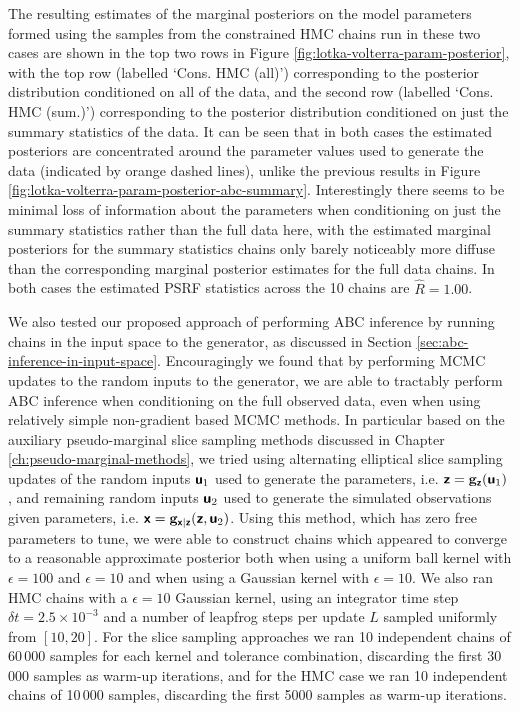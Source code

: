 The resulting estimates of the marginal posteriors on the model parameters formed using the samples from the constrained \ac{HMC} chains run in these two cases are shown in the top two rows in Figure \ref{fig:lotka-volterra-param-posterior}, with the top row (labelled `Cons. HMC (all)') corresponding to the posterior distribution conditioned on all of the data, and the second row (labelled `Cons. HMC (sum.)') corresponding to the posterior distribution conditioned on just the summary statistics of the data. It can be seen that in both cases the estimated posteriors are concentrated around the parameter values used to generate the data (indicated by orange dashed lines), unlike the previous results in Figure \ref{fig:lotka-volterra-param-posterior-abc-summary}. Interestingly there seems to be minimal loss of information about the parameters when conditioning on just the summary statistics rather than the full data here, with the estimated marginal posteriors for the summary statistics chains only barely noticeably more diffuse than the corresponding marginal posterior estimates for the full data chains. In both cases the estimated \ac{PSRF} statistics across the 10 chains are $\hat{R} = 1.00$.

We also tested our proposed approach of performing \ac{ABC} inference by running chains in the input space to the generator, as discussed in Section \ref{sec:abc-inference-in-input-space}. Encouragingly we found that by performing \ac{MCMC} updates to the random inputs to the generator, we are able to tractably perform \ac{ABC} inference when conditioning on the full observed data, even when using relatively simple non-gradient based \ac{MCMC} methods. In particular based on the auxiliary pseudo-marginal slice sampling methods discussed in Chapter \ref{ch:pseudo-marginal-methods}, we tried using alternating elliptical slice sampling updates of the random inputs $\boldsymbol{\mathsf{u}}_1$ used to generate the parameters, i.e. $\boldsymbol{\mathsf{z}} = {\mathbf{g}}_{\boldsymbol{\mathsf{z}}}(\boldsymbol{\mathsf{u}}_1)$, and remaining random inputs $\boldsymbol{\mathsf{u}}_2$ used to generate the simulated observations given parameters, i.e. $\boldsymbol{\mathsf{x}} = {\mathbf{g}}_{\boldsymbol{\mathsf{x}}|\boldsymbol{\mathsf{z}}}(\boldsymbol{\mathsf{z}},\boldsymbol{\mathsf{u}}_2)$. Using this method, which has zero free parameters to tune, we were able to construct chains which appeared to converge to a reasonable approximate posterior both when using a uniform ball kernel with $\epsilon=100$ and $\epsilon=10$ and when using a Gaussian kernel with $\epsilon=10$. We also ran \ac{HMC} chains with a $\epsilon=10$ Gaussian kernel, using an integrator time step $\delta t = 2.5 \times 10^{-3}$ and a number of leapfrog steps per update $L$ sampled uniformly from $[10, 20]$. For the slice sampling approaches we ran 10 independent chains of 60\,000 samples for each kernel and tolerance combination, discarding the first 30\,000 samples as warm-up iterations, and for the \ac{HMC} case we ran 10 independent chains of 10\,000 samples, discarding the first 5000 samples as warm-up iterations.

